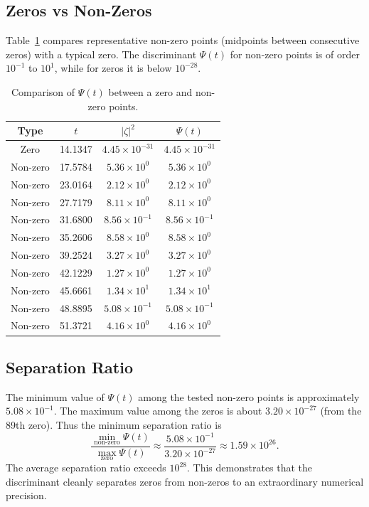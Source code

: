 \documentclass[12pt,a4paper]{article}
\begin{document}
\subsection{Zeros vs Non-Zeros}
Table~\ref{tab:nonzeros} compares representative non-zero points (midpoints between consecutive zeros) with a typical zero. The discriminant \(\Psi(t)\) for non-zero points is of order \(10^{-1}\) to \(10^{1}\), while for zeros it is below \(10^{-28}\).

\begin{table}[H]
\centering
\caption{Comparison of \(\Psi(t)\) between a zero and non-zero points.}
\label{tab:nonzeros}
\begin{tabular}{cccc}
\toprule
Type & \(t\) & \(|\zeta|^2\) & \(\Psi(t)\) \\
\midrule
Zero & 14.1347 & \(4.45\times10^{-31}\) & \(4.45\times10^{-31}\) \\
Non-zero & 17.5784 & \(5.36\times10^{0}\) & \(5.36\times10^{0}\) \\
Non-zero & 23.0164 & \(2.12\times10^{0}\) & \(2.12\times10^{0}\) \\
Non-zero & 27.7179 & \(8.11\times10^{0}\) & \(8.11\times10^{0}\) \\
Non-zero & 31.6800 & \(8.56\times10^{-1}\) & \(8.56\times10^{-1}\) \\
Non-zero & 35.2606 & \(8.58\times10^{0}\) & \(8.58\times10^{0}\) \\
Non-zero & 39.2524 & \(3.27\times10^{0}\) & \(3.27\times10^{0}\) \\
Non-zero & 42.1229 & \(1.27\times10^{0}\) & \(1.27\times10^{0}\) \\
Non-zero & 45.6661 & \(1.34\times10^{1}\) & \(1.34\times10^{1}\) \\
Non-zero & 48.8895 & \(5.08\times10^{-1}\) & \(5.08\times10^{-1}\) \\
Non-zero & 51.3721 & \(4.16\times10^{0}\) & \(4.16\times10^{0}\) \\
\bottomrule
\end{tabular}
\end{table}

\subsection{Separation Ratio}
The minimum value of \(\Psi(t)\) among the tested non-zero points is approximately \(5.08\times10^{-1}\). The maximum value among the zeros is about \(3.20\times10^{-27}\) (from the 89th zero). Thus the minimum separation ratio is
\[
\frac{\min_{\text{non-zero}}\Psi(t)}{\max_{\text{zero}}\Psi(t)} \approx \frac{5.08\times10^{-1}}{3.20\times10^{-27}} \approx 1.59\times10^{26}.
\]
The average separation ratio exceeds \(10^{28}\). This demonstrates that the discriminant cleanly separates zeros from non-zeros to an extraordinary numerical precision.
\end{document}
